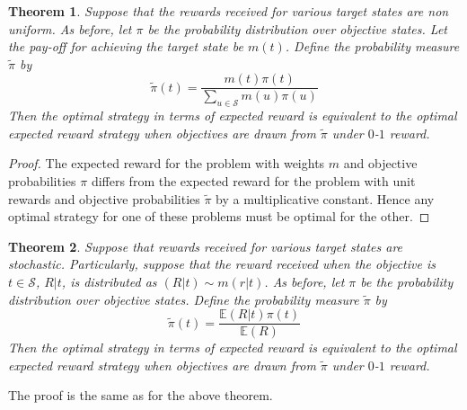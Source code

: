 \documentclass{article}
\newtheorem{theorem}{Theorem}
\newcommand{\EE}{\mathbb{E}}
\newcommand{\Ss}{\mathcal{S}}
\begin{document}
\begin{theorem}
Suppose that the rewards received for various target states are non uniform. As before, let $\pi$ be the probability distribution over objective states. 
Let the pay-off for achieving the target state be $m(t)$. 
Define the probability measure $\tilde{\pi}$ by
\[\tilde{\pi}(t)=\frac{m(t)\pi(t)}{\sum_{u\in\Ss} m(u)\pi(u)}\] 
Then the optimal strategy in terms of expected reward is equivalent to the optimal expected reward strategy when objectives are drawn from $\tilde{\pi}$ under $0$-$1$ reward.
\end{theorem}
\begin{proof}
The expected reward for the problem with weights $m$ and objective probabilities $\pi$ differs from the expected reward for the problem with unit rewards and objective probabilities $\tilde{\pi}$ by a multiplicative constant. Hence any optimal strategy for one of these problems must be optimal for the other. 
\end{proof}
\begin{theorem} 
Suppose that rewards received for various target states are stochastic. Particularly, suppose that the reward received when the objective is $t\in\Ss$, $R|t$, is distributed as $(R|t)\sim m(r|t)$. As before, let $\pi$ be the probability distribution over objective states. Define the probability measure $\tilde{\pi}$ by
\[\tilde{\pi}(t)=\frac{\EE(R|t)\pi(t)}{\EE(R)}\] 
Then the optimal strategy in terms of expected reward is equivalent to the optimal expected reward strategy when objectives are drawn from $\tilde{\pi}$ under $0$-$1$ reward.
\end{theorem}
The proof is the same as for the above theorem.
\end{document}

